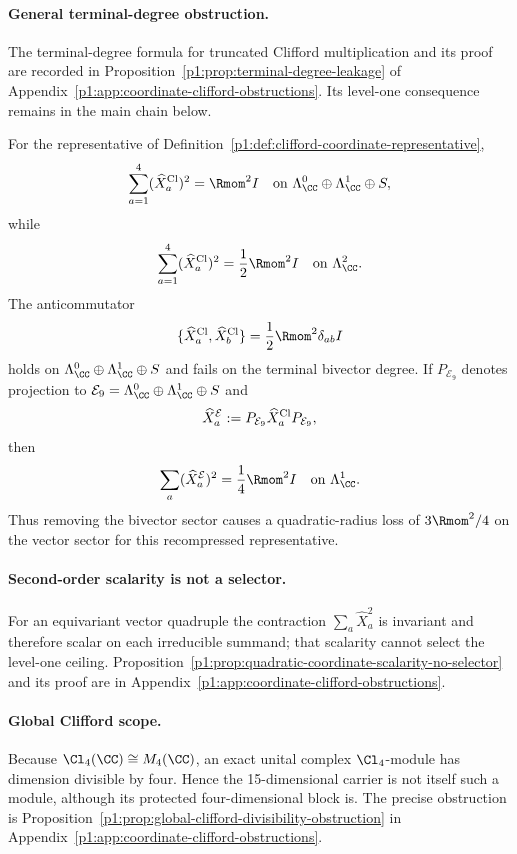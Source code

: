 \documentclass[11pt]{article}
\begin{document}
\paragraph{General terminal-degree obstruction.}
The terminal-degree formula for truncated Clifford multiplication and its
proof are recorded in
Proposition~\ref{p1:prop:terminal-degree-leakage} of
Appendix~\ref{p1:app:coordinate-clifford-obstructions}.  Its level-one
consequence remains in the main chain below.

\begin{corollary}
\label{p1:cor:clifford-level-one-values}
For the representative of
Definition~\ref{p1:def:clifford-coordinate-representative},
\[
 \sum_{a=1}^4(\widehat X_a^{\rm Cl})^2
 =\Rmom^2 I
 \quad\text{on }\Lambda^0_\CC\oplus\Lambda^1_\CC\oplus S,
\]
while
\[
 \sum_{a=1}^4(\widehat X_a^{\rm Cl})^2
 =\frac12\Rmom^2 I
 \quad\text{on }\Lambda^2_\CC.
\]
The anticommutator
\[
 \{\widehat X_a^{\rm Cl},\widehat X_b^{\rm Cl}\}
 =\frac12\Rmom^2\delta_{ab}I
\]
holds on \(\Lambda^0_\CC\oplus\Lambda^1_\CC\oplus S\) and fails on the
terminal bivector degree.  If
\(P_{\mathcal E_9}\) denotes projection to
\(\mathcal E_9=\Lambda^0_\CC\oplus\Lambda^1_\CC\oplus S\) and
\[
 \widehat X_a^{\mathcal E}:=
 P_{\mathcal E_9}\widehat X_a^{\rm Cl}P_{\mathcal E_9},
\]
then
\[
 \sum_a(\widehat X_a^{\mathcal E})^2
 =\frac14\Rmom^2 I
 \quad\text{on }\Lambda^1_\CC.
\]
Thus removing the bivector sector causes a quadratic-radius loss of
\(3\Rmom^2/4\) on the vector sector for this recompressed representative.
\end{corollary}

\paragraph{Second-order scalarity is not a selector.}
For an equivariant vector quadruple the contraction
\(\sum_a\widehat X_a^2\) is invariant and therefore scalar on each
irreducible summand; that scalarity cannot select the level-one ceiling.
Proposition~\ref{p1:prop:quadratic-coordinate-scalarity-no-selector} and its
proof are in Appendix~\ref{p1:app:coordinate-clifford-obstructions}.

\paragraph{Global Clifford scope.}
Because \(\Cl_4(\CC)\cong M_4(\CC)\), an exact unital complex
\(\Cl_4\)-module has dimension divisible by four.  Hence the
15-dimensional carrier is not itself such a module, although its protected
four-dimensional block is.  The precise obstruction is
Proposition~\ref{p1:prop:global-clifford-divisibility-obstruction} in
Appendix~\ref{p1:app:coordinate-clifford-obstructions}.
\end{document}
